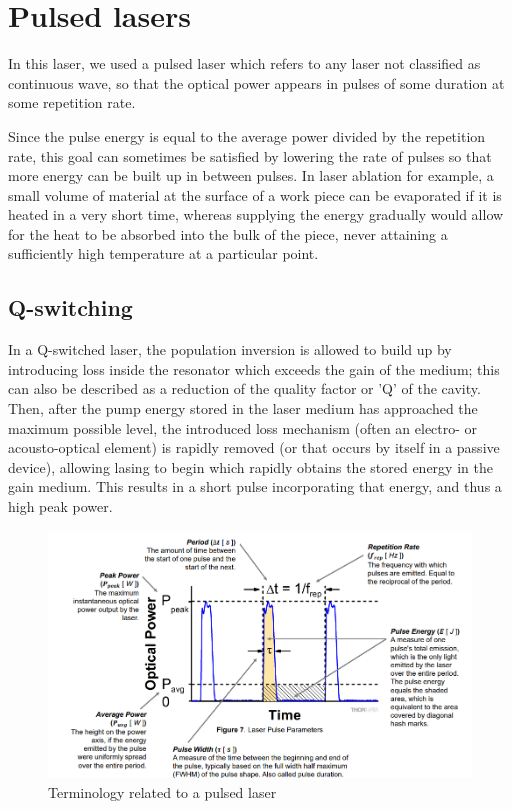 \documentclass[%
 reprint,
 amsmath,amssymb,
 aps,
]{revtex4-2}
\begin{document}
\section{Pulsed lasers}\label{pulsed}
	In this laser, we used a pulsed laser which refers to any laser not classified as continuous wave, so that the optical power appears in pulses of some duration at some repetition rate.
	\par 
	Since the pulse energy is equal to the average power divided by the repetition rate, this goal can sometimes be satisfied by lowering the rate of pulses so that more energy can be built up in between pulses. In laser ablation for example, a small volume of material at the surface of a work piece can be evaporated if it is heated in a very short time, whereas supplying the energy gradually would allow for the heat to be absorbed into the bulk of the piece, never attaining a sufficiently high temperature at a particular point.
	\subsection{Q-switching}
		In a Q-switched laser, the population inversion is allowed to build up by introducing loss inside the resonator which exceeds the gain of the medium; this can also be described as a reduction of the quality factor or 'Q' of the cavity. Then, after the pump energy stored in the laser medium has approached the maximum possible level, the introduced loss mechanism (often an electro- or acousto-optical element) is rapidly removed (or that occurs by itself in a passive device), allowing lasing to begin which rapidly obtains the stored energy in the gain medium. This results in a short pulse incorporating that energy, and thus a high peak power.
	\begin{figure}
		\includegraphics[scale = 0.41]{pulsedlaser}
		\caption{Terminology related to a pulsed laser}
	\end{figure}
\end{document}
